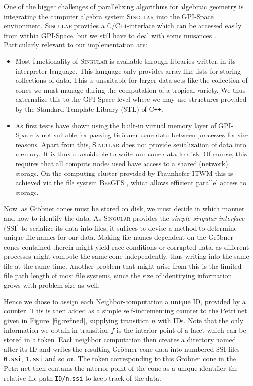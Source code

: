 \documentclass[
  paper=a4,
  titlepage,
  bibliography=totoc,
  pagesize=pdftex
]{scrartcl}
\numberwithin{figure}{section}
\numberwithin{equation}{section}
\numberwithin{table}{section}
\newcommand{\Cpp}{C\nolinebreak\texttt{++}}
\theoremstyle{definition}
\numberwithin{definition}{section}
\begin{document}
One of the bigger challenges of parallelizing algorithms for algebraic geometry is
integrating the computer algebra system \textsc{Singular} into the GPI-Space environment.
\textsc{Singular} provides a C/\Cpp-interface which can be accessed easily from within
GPI-Space, but we still have to deal with some nuisances
\cite[Section~4.2]{reinboldGitFan}. Particularly relevant to our implementation are:
\begin{itemize}
  \item Most functionality of \textsc{Singular} is available through libraries written in
    its interpreter language. This language only provides array-like lists for storing
    collections of data. This is unsuitable for larger data sets like the collection of
    cones we must manage during the computation of a tropical variety. We thus externalize
    this to the GPI-Space-level where we may use structures provided by the Standard
    Template Library (STL) of \Cpp.
  \item As first tests have shown using the built-in virtual memory layer of GPI-Space is
    not suitable for passing Gröbner cone data between processes for size reasons. Apart
    from this, \textsc{Singular} does not provide serialization of data into memory. It is
    thus unavoidable to write our cone data to disk. Of course, this requires that all
    compute nodes used have access to a shared (network) storage. On the computing cluster
    provided by Fraunhofer ITWM this is achieved via the file system \textsc{BeeGFS}
    \cite{bgfs}, which allows efficient parallel access to storage.
\end{itemize}

Now, as Gröbner cones must be stored on disk, we must decide in which manner and how to
identify the data. As \textsc{Singular} provides the \emph{simple singular interface}
(SSI) to serialize its data into files, it suffices to devise a method to determine unique
file names for our data. Making file names dependent on the Gröbner cones contained
therein might yield race conditions or corrupted data, as different processes might
compute the same cone independently, thus writing into the same file at the same time.
Another problem that might arise from this is the limited file path length of most file
systems, since the size of identifying information grows with problem size as well.

Hence we chose to assign each Neighbor-computation a unique ID, provided by a counter.
This is then added as a simple self-incrementing counter to the Petri net given in
Figure~\ref{fig:refined}, supplying transition $n$ with IDs. Note that the only
information we obtain in transition $f$ is the interior point of a facet which can be
stored in a token. Each neighbor computation then creates a directory named after its ID
and writes the resulting Gröbner cone data into numbered SSI-files \texttt{0.ssi},
\texttt{1.ssi} and so on. The token corresponding to this Gröbner cone in the Petri net
then contains the interior point of the cone as a unique identifier the relative file path
\texttt{ID/n.ssi} to keep track of the data.
\end{document}
